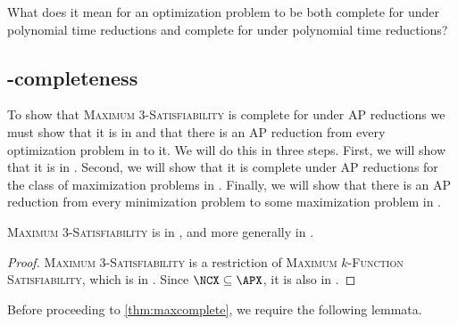 \documentclass[]{article}
\begin{document}
\begin{todo}
  What does it mean for an optimization problem to be both complete for \APX{} under polynomial time reductions and complete for \NCX{} under polynomial time reductions?
\end{todo}

\subsection{\texorpdfstring{\APX}{APX}-completeness}\label{ssc:apxcomplete}

To show that \textsc{Maximum 3-Satisfiability} is complete for \APX{} under AP reductions we must show that it is in \APX{} and that there is an AP reduction from every optimization problem in \APX{} to it.
We will do this in three steps.
First, we will show that it is in \APX.
Second, we will show that it is complete under AP reductions for the class of maximization problems in \APX.
Finally, we will show that there is an AP reduction from every minimization problem to some maximization problem in \APX.

\begin{theorem}\label{thm:inncx}\label{thm:inapx}
  \textsc{Maximum 3-Satisfiability} is in \NCX, and more generally in \APX.
\end{theorem}
\begin{proof}
  \textsc{Maximum 3-Satisfiability} is a restriction of \textsc{Maximum $k$-Function Satisfiability}, which is in \NCX{} \cite[Corollary~13]{trevisan98}.
  Since $\NCX \subseteq \APX$, it is also in \APX.
\end{proof}

Before proceeding to \autoref{thm:maxcomplete}, we require the following lemmata.
\end{document}
